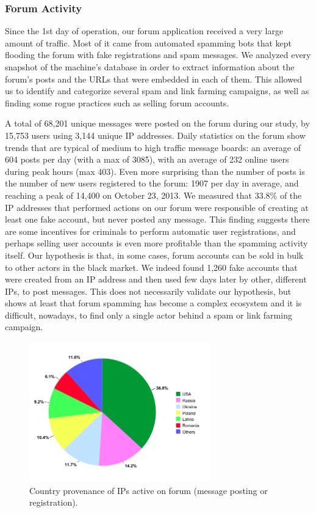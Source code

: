 \subsubsection{Forum Activity}

Since the 1st day of operation, our forum application received a very large amount of traffic. Most of it came from automated spamming bots that kept flooding the forum with fake registrations and spam messages. We analyzed every snapshot of the machine's database in order to extract information about the forum's posts and the URLs that were embedded in each of them. This allowed us to identify and categorize several spam and link farming campaigns, as well as finding some rogue practices such as selling forum accounts.

A total of 68,201 unique messages were posted on the forum during our study, by 15,753 users using 3,144 unique IP addresses. Daily statistics on the forum show trends that are typical of medium to high traffic message boards: an average of 604 posts per day (with a max of 3085), with an average of 232 online users during peak hours (max 403).
Even more surprising than the number of posts is the number of new users registered to the forum: 1907 per day in average, and reaching a peak of 14,400 on October 23, 2013. We measured that 33.8\% of the IP addresses that performed actions on our forum were responsible of creating at least one fake account, but never posted any message. This finding suggests there are some incentives for criminals to perform automatic user registrations, and perhaps selling user accounts is even more profitable than the spamming activity itself. Our hypothesis is that, in some cases, forum accounts can be sold in bulk to other actors in the black market. We indeed found 1,260 fake accounts that were created from an IP address and then used few days later by other, different IPs, to post messages. This does not necessarily validate our hypothesis, but shows at least that forum spamming has become a complex ecosystem and it is difficult, nowadays, to find only a single actor behind a spam or link farming campaign.

\begin{figure}[tbh]
\centerline{\includegraphics[width=0.7\textwidth]{Images/spamCountriesIP.png}}
\caption{Country provenance of IPs active on forum (message posting or registration).\label{fig:spamCountriesIP}}
\end{figure}

